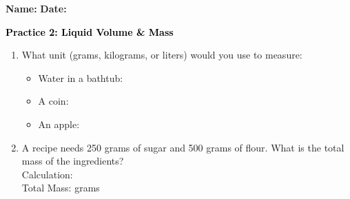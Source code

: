 \documentclass[12pt, letterpaper, fleqn]{article}
\newcommand{\blank}{\underline{\hspace{2.2cm}}}
\begin{document}
\textbf{Name:} \underline{\hspace{5cm}}
\hfill
\textbf{Date:} \underline{\hspace{3cm}}\\

\begin{tcolorbox}[colback=customteal!20]
    \large\textcolor{black}{\textbf{Practice 2: Liquid Volume & Mass}}
\end{tcolorbox}

\vspace{5mm}
\begin{enumerate}[itemsep=2.5cm, leftmargin=0.6cm]
\item What unit (grams, kilograms, or liters) would you use to measure:
  \begin{itemize}[itemsep=0.8cm]
    \item Water in a bathtub: \blank
    \item A coin: \blank
    \item An apple: \blank
  \end{itemize}

\item A recipe needs 250 grams of sugar and 500 grams of flour. What is the total mass of the ingredients?
\\
Calculation: \vspace{2cm}
\\
Total Mass: \blank grams
\end{enumerate}
\end{document}
